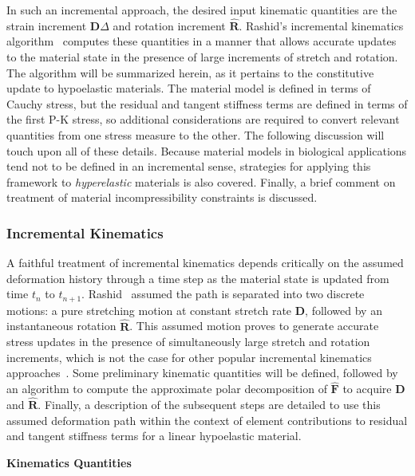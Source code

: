 In such an incremental approach, the desired input kinematic quantities are the strain increment $\bm{D}\Delta$ and rotation increment $\hat{\bm{R}}$. Rashid's incremental kinematics algorithm~\cite{rashid_1993} computes these quantities in a manner that allows accurate updates to the material state in the presence of large increments of stretch and rotation. The algorithm will be summarized herein, as it pertains to the constitutive update to hypoelastic materials. The material model is defined in terms of Cauchy stress, but the residual and tangent stiffness terms are defined in terms of the first P-K stress, so additional considerations are required to convert relevant quantities from one stress measure to the other. The following discussion will touch upon all of these details. Because material models in biological applications tend not to be defined in an incremental sense, strategies for applying this framework to \textit{hyperelastic} materials is also covered. Finally, a brief comment on treatment of material incompressibility constraints is discussed.

\subsubsection{Incremental Kinematics}

A faithful treatment of incremental kinematics depends critically on the assumed deformation history through a time step as the material state is updated from time $t_n$ to $t_{n+1}$. Rashid~\cite{rashid_1993} assumed the path is separated into two discrete motions: a pure stretching motion at constant stretch rate $\bm{D}$, followed by an instantaneous rotation $\hat{\bm{R}}$. This assumed motion proves to generate accurate stress updates in the presence of simultaneously large stretch and rotation increments, which is not the case for other popular incremental kinematics approaches~\cite{rashid_1996}. Some preliminary kinematic quantities will be defined, followed by an algorithm to compute the approximate polar decomposition of $\hat{\bm{F}}$ to acquire $\bm{D}$ and $\hat{\bm{R}}$. Finally, a description of the subsequent steps are detailed to use this assumed deformation path within the context of element contributions to residual and tangent stiffness terms for a linear hypoelastic material.

\textbf{Kinematics Quantities}

